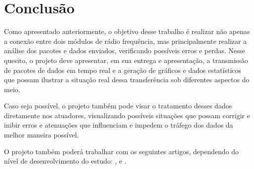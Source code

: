 \documentclass[conference]{IEEEtran}
\begin{document}
\section{Conclus\~ao}
Como apresentado anteriormente, o objetivo desse trabalho \'e realizar n\~ao apenas a conex\~ao entre dois m\'odulos de r\'adio frequ\^encia, mas principalmente realizar a an\'alise dos pacotes e dados enviados, verificando poss\'iveis erros e perdas. Nesse quesito, o projeto deve apresentar, em sua entrega e apresenta\c{c}\~ao, a transmiss\~ao de pacotes de dados em tempo real e a gera\c{c}\~ao de gr\'aficos e dados estat\'isticos que possam ilustrar a situa\c{c}\~ao real dessa transfer\^encia sob diferentes aspectos do meio.

Caso seja poss\'ivel, o projeto tamb\'em pode visar o tratamento desses dados diretamente nos atuadores, visualizando poss\'iveis situa\c{c}\~oes que possam corrigir e inibir erros e atenua\c{c}\~oes que influenciam e impedem o tr\'afego dos dados da melhor maneira poss\'ivel.

O projeto tamb\'em poder\'a trabalhar com os seguintes artigos, dependendo do n\'ivel de desenvolvimento do estudo: \cite{performanceAnalysisNRF24L01}, \cite{efficientRFPowerTransfer} e \cite{selectionOpticalWavelengthDataTransmission}.













\def\refname{Refer\^encias}


%






\end{document}
